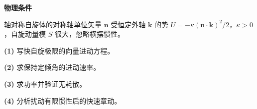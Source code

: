 \textbf{物理条件}\par 轴对称自旋体的对称轴单位矢量 \(\boldsymbol n\) 受恒定外轴 \(\boldsymbol k\) 的势 \(U=-\kappa(\boldsymbol n\cdot\boldsymbol k)^2/2\)，\(\kappa>0\)，自旋动量模 \(S\) 很大，忽略横摆惯性。
\par\noindent\textbf{(1)} 写快自旋极限的向量进动方程。
\par\noindent\textbf{(2)} 求保持定倾角的进动速率。
\par\noindent\textbf{(3)} 求功率并验证无耗散。
\par\noindent\textbf{(4)} 分析扰动有限惯性后的快速章动。
